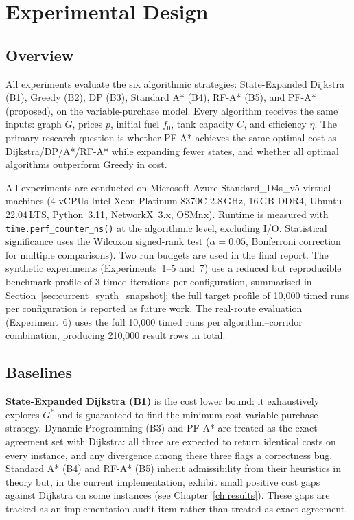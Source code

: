 \chapter{Experimental Design}
\label{ch:experiments}

\section{Overview}

All experiments evaluate the six algorithmic strategies: State-Expanded Dijkstra (B1),
Greedy (B2), DP (B3), Standard A* (B4), RF-A* (B5), and PF-A* (proposed), on the
variable-purchase model.
Every algorithm receives the same inputs: graph $G$, prices $p$, initial fuel $f_0$, tank
capacity $C$, and efficiency $\eta$.
The primary research question is whether PF-A* achieves the same optimal cost as
Dijkstra/DP/A*/RF-A* while expanding fewer states, and whether all optimal algorithms
outperform Greedy in cost.

All experiments are conducted on Microsoft Azure Standard\_D4s\_v5 virtual machines
(4 vCPUs Intel Xeon Platinum 8370C 2.8\,GHz, 16\,GB DDR4, Ubuntu 22.04\,LTS,
Python~3.11, NetworkX~3.x, OSMnx).
Runtime is measured with \texttt{time.perf\_counter\_ns()} at the algorithmic level,
excluding I/O.
Statistical significance uses the Wilcoxon signed-rank test ($\alpha=0.05$, Bonferroni
correction for multiple comparisons).
Two run budgets are used in the final report.
The synthetic experiments (Experiments~1--5 and~7) use a reduced but reproducible
benchmark profile of 3 timed iterations per configuration, summarised in
Section~\ref{sec:current_synth_snapshot}; the full target profile of 10{,}000 timed runs
per configuration is reported as future work.
The real-route evaluation (Experiment~6) uses the full 10{,}000 timed runs per
algorithm--corridor combination, producing 210{,}000 result rows in total.

\section{Baselines}

\textbf{State-Expanded Dijkstra (B1)} is the cost lower bound: it exhaustively explores
$G^{*}$ and is guaranteed to find the minimum-cost variable-purchase strategy.
Dynamic Programming (B3) and PF-A* are treated as the exact-agreement set with
Dijkstra: all three are expected to return identical costs on every instance, and any
divergence among these three flags a correctness bug.
Standard A* (B4) and RF-A* (B5) inherit admissibility from their heuristics in theory but,
in the current implementation, exhibit small positive cost gaps against Dijkstra on some
instances (see Chapter~\ref{ch:results}).
These gaps are tracked as an implementation-audit item rather than treated as exact
agreement.

